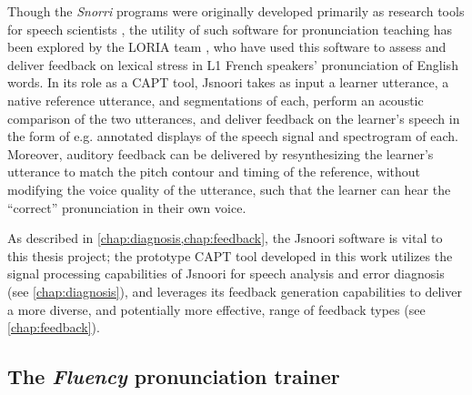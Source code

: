 	Though the \textit{Snorri} programs were originally developed primarily as research tools for speech scientists %
	\citep{Fohr1989,Laprie1999}, 
	the utility of such software
	for pronunciation teaching has been explored by the LORIA team \citep{Bonneau2004,Henry2007,Bonneau2011},
	who have used 
	this software to assess and deliver feedback on lexical stress in L1 French speakers' pronunciation of English words. 
In its role as a CAPT tool, Jsnoori 
takes as input a learner utterance, a native reference utterance, and segmentations of each, perform an acoustic comparison of the two utterances, and deliver feedback on the learner's speech in the form of e.g. annotated displays of the speech signal and spectrogram of each. Moreover, auditory feedback can be delivered 
by
resynthesizing the learner's utterance to match the pitch contour and timing of the reference, without modifying the voice quality of the utterance, such that the learner can hear the ``correct'' pronunciation in their own voice. 
%
	
	
	

As described in \cref{chap:diagnosis,chap:feedback}, 
the Jsnoori software is vital to this thesis project;
the prototype CAPT tool developed in this work 
utilizes the signal processing capabilities of Jsnoori 
for speech analysis and error diagnosis (see \cref{chap:diagnosis}), 
and leverages its feedback generation capabilities to deliver  a more diverse, and potentially more effective, range of feedback types (see \cref{chap:feedback}). 
	

	\subsection{The \textit{Fluency} pronunciation trainer}
	\label{sec:capt:fluency}
	
